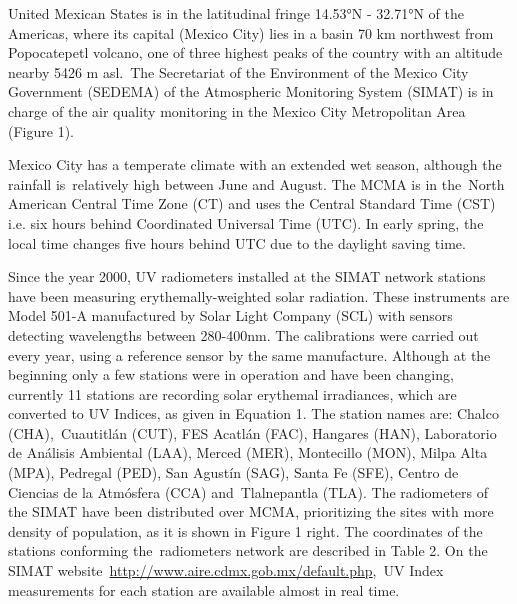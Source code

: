 \documentclass{article}
\begin{document}
United Mexican States is in the latitudinal fringe 14.53°N - 32.71°N of
the Americas, where its capital (Mexico City) lies in a basin 70 km
northwest from Popocatepetl volcano, one of three highest peaks of the
country with an altitude nearby 5426 m asl.~The Secretariat of the
Environment of the Mexico City Government (SEDEMA) of the Atmospheric
Monitoring System (SIMAT) is in charge of the air quality monitoring in
the Mexico City Metropolitan Area
(Figure 1).~~

Mexico City has a temperate climate with an extended wet season,
although the rainfall is~relatively high between June and August. The
MCMA is in the~North American Central Time Zone (CT) and uses the
Central Standard Time (CST) i.e. six hours behind Coordinated Universal
Time (UTC). In early spring, the local time changes five hours behind
UTC due to the daylight saving time.

Since the year 2000, UV radiometers installed at the SIMAT network
stations have been measuring erythemally-weighted solar radiation. These
instruments are Model 501-A manufactured by Solar Light Company (SCL)
with sensors detecting wavelengths between 280-400nm. The calibrations
were carried out every year, using a reference sensor by the same
manufacture. Although at the beginning only a few stations were in
operation and have been changing, currently 11 stations are recording
solar erythemal irradiances, which are converted to UV Indices, as given
in Equation 1. The station names are: Chalco (CHA),~Cuautitlán (CUT),
FES Acatlán (FAC), Hangares (HAN), Laboratorio de Análisis Ambiental
(LAA), Merced (MER), Montecillo (MON), Milpa Alta (MPA), Pedregal (PED),
San Agustín (SAG), Santa Fe (SFE), Centro de Ciencias de la Atmósfera
(CCA) and~Tlalnepantla (TLA). The radiometers of the SIMAT have been
distributed over MCMA, prioritizing the sites with more density of
population, as it is shown in Figure 1 %
right. The coordinates of the stations conforming the~radiometers
network are described in Table 2. On the SIMAT
website~\url{http://www.aire.cdmx.gob.mx/default.php},~UV Index
measurements for each station are available almost in real time.~
\end{document}
